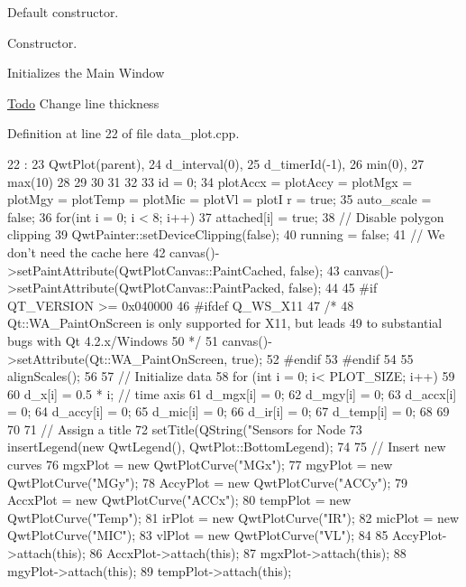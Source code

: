 Default constructor. 

Constructor.

Initializes the Main Window 

\begin{Desc}
\item[\hyperlink{todo__todo000001}{Todo}]Change line thickness \end{Desc}




Definition at line 22 of file data\_\-plot.cpp.




\begin{DoxyCode}
22                                  :
23     QwtPlot(parent),
24     d_interval(0),
25     d_timerId(-1),
26     min(0),
27     max(10)
28 
29 
30 
31 {
32 
33     id = 0;
34     plotAccx = plotAccy = plotMgx = plotMgy = plotTemp = plotMic = plotVl = plotI
      r = true;
35     auto_scale = false;
36     for(int i = 0; i < 8; i++)
37         attached[i] = true;
38     // Disable polygon clipping
39     QwtPainter::setDeviceClipping(false);
40     running = false;
41     // We don't need the cache here
42     canvas()->setPaintAttribute(QwtPlotCanvas::PaintCached, false);
43     canvas()->setPaintAttribute(QwtPlotCanvas::PaintPacked, false);
44 
45 #if QT_VERSION >= 0x040000
46 #ifdef Q_WS_X11
47     /*
48        Qt::WA_PaintOnScreen is only supported for X11, but leads
49        to substantial bugs with Qt 4.2.x/Windows
50      */
51     canvas()->setAttribute(Qt::WA_PaintOnScreen, true);
52 #endif
53 #endif
54 
55     alignScales();
56     
57     //  Initialize data
58     for (int i = 0; i< PLOT_SIZE; i++)
59     {
60         d_x[i] = 0.5 * i;     // time axis
61         d_mgx[i] = 0;
62         d_mgy[i] = 0;
63         d_accx[i] = 0;
64         d_accy[i] = 0;
65         d_mic[i] = 0;
66         d_ir[i] = 0;
67         d_temp[i] = 0;
68     }
69 
70 
71     // Assign a title
72     setTitle(QString("Sensors for Node %
73     insertLegend(new QwtLegend(), QwtPlot::BottomLegend);
74 
75     // Insert new curves
76     mgxPlot = new QwtPlotCurve("MGx");
77     mgyPlot = new QwtPlotCurve("MGy");
78     AccyPlot = new QwtPlotCurve("ACCy");
79     AccxPlot = new QwtPlotCurve("ACCx");
80     tempPlot = new QwtPlotCurve("Temp");
81     irPlot = new QwtPlotCurve("IR");
82     micPlot = new QwtPlotCurve("MIC");
83     vlPlot = new QwtPlotCurve("VL");
84 
85     AccyPlot->attach(this);
86     AccxPlot->attach(this);
87     mgxPlot->attach(this);
88     mgyPlot->attach(this);
89     tempPlot->attach(this);
}
\end{DoxyCode}
